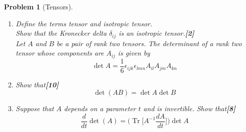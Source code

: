 \documentclass[a4paper]{article}
\DeclareMathOperator{\Tr}{Tr}
\theoremstyle{new}
\newtheorem{qns}{Problem}[section]
\begin{document}
\newpage
\begin{qns}[Tensors]\leavevmode
\begin{enumerate}[label=(\roman*)]
\item Define the terms tensor and isotropic tensor.\\[5pt]
Show that the Kronecker delta $\delta_{ij}$ is an isotropic tensor.\hfill\textbf{[2]}\\[5pt]
Let $A$ and $B$ be a pair of rank two tensors. The determinant of a rank two tensor whose components are $A_{ij}$ is given by
$$\det A =\frac{1}{6}\epsilon_{ijk}\epsilon_{lmn}A_{il}A_{jm}A_{kn}$$
\item Show that\hfill\textbf{[10]}
$$\det(AB) = \det A \det B$$
\item Suppose that $A$ depends on a parameter $t$ and is invertible. Show that\hfill\textbf{[8]}
$$\frac{d}{dt}\det(A)=\bigg(\Tr \bigg[A^{-1}\frac{dA}{dt}\bigg]\bigg)\det A$$
\end{enumerate}
\end{qns}
\end{document}
